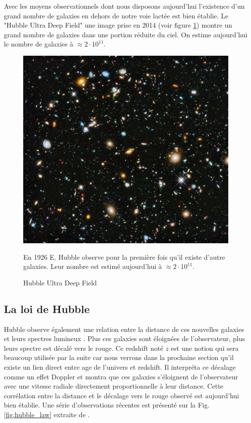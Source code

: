 Avec les moyens observationnels dont nous disposons aujourd'hui l’existence d'un grand nombre de galaxies en dehors de notre voie lactée est bien établie.
Le "Hubble Ultra Deep Field" \citep{1538-3881-132-5-1729} une image prise en 2014 (voir figure \ref{fig:hubbl_deep_field}) montre un grand nombre de galaxies dans une portion réduite du ciel.
On estime aujourd'hui le nombre de galaxies à $\approx 2 \cdot 10^{11}$.

\begin{figure}[bth]
        \includegraphics[width=.9\linewidth]{img/01/hudf.jpeg} 
        \caption{Hubble Ultra Deep Field} 
		En 1926 E. Hubble observe pour la première fois qu'il existe d'autre galaxies.
		Leur nombre est estimé aujourd'hui à $\approx 2 \cdot 10^{11}$.
 		\label{fig:hubbl_deep_field}
\end{figure}

\subsection{La loi de Hubble}
Hubble observe également une relation entre la distance de ces nouvelles galaxies et leurs spectres lumineux \citep{1929CoMtW...3...23H}.
Plus ces galaxies sont éloignées de l'observateur, plus leurs spectre est décalé vers le rouge.
Ce redshift noté $z$ est une notion qui sera beaucoup utilisée par la suite car nous verrons dans la prochaine section qu'il existe un lien direct entre age de l'univers et redshift.
Il interpréta ce décalage comme un effet Doppler et montra que ces galaxies s'éloignent de l'observateur avec une vitesse radiale directement proportionnelle à leur distance.
Cette corrélation entre la distance et le décalage vers le rouge observé est aujourd'hui bien établie.
Une série d'observations récentes est présenté sur la Fig. \ref{fig:hubble_law} extraite de \citep{2015PNAS..112.3173B}.

